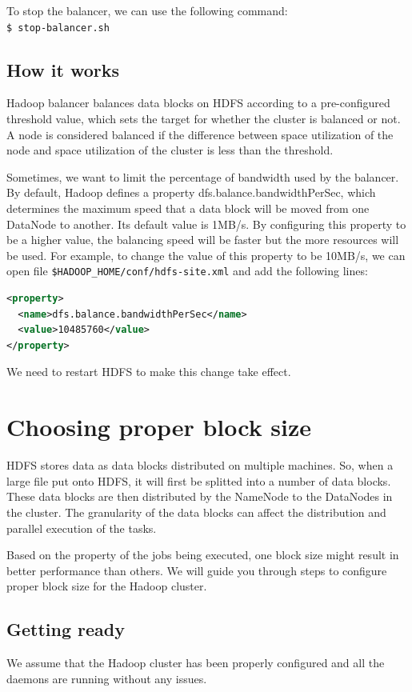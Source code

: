 To stop the balancer, we can use the following command:\\
\verb|$ stop-balancer.sh|

\subsection*{How it works}
Hadoop balancer balances data blocks on HDFS according to a pre-configured threshold value, which sets the target for whether the cluster is balanced or not. A node is considered balanced if the difference between space utilization of the node and space utilization of the cluster is less than the threshold.

Sometimes, we want to limit the percentage of bandwidth used by the balancer. By default, Hadoop defines a property dfs.balance.bandwidthPerSec, which determines the maximum speed that a data block will be moved from one DataNode to another. Its default value is 1MB/s. By configuring this property to be a higher value, the balancing speed will be faster but the more resources will be used. For example, to change the value of this property to be 10MB/s, we can open file \verb|$HADOOP_HOME/conf/hdfs-site.xml| and add the following lines:
\lstset{style=bashstyle}
\begin{lstlisting}[language=XML]
<property>
  <name>dfs.balance.bandwidthPerSec</name>
  <value>10485760</value>
</property>
\end{lstlisting}
\begin{info}We need to restart HDFS to make this change take effect.\end{info}

\section{Choosing proper block size}
HDFS stores data as data blocks distributed on multiple machines. So, when a large file put onto HDFS, it will first be splitted into a number of data blocks. These data blocks are then distributed by the NameNode to the DataNodes in the cluster. The granularity of the data blocks can affect the distribution and parallel execution of the tasks.

Based on the property of the jobs being executed, one block size might result in better performance than others. We will guide you through steps to configure proper block size for the Hadoop cluster.
\subsection*{Getting ready}
We assume that the Hadoop cluster has been properly configured and all the daemons are running without any issues.

